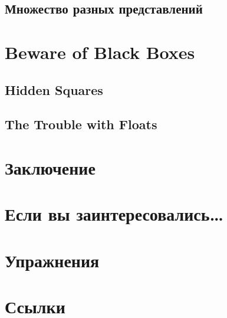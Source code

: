 \subsection{Множество разных представлений}

\newpage
\section{Beware of Black Boxes}
\subsection{Hidden Squares}
\subsection{The Trouble with Floats}
\section{Заключение}
\section{Если вы заинтересовались…}
\section{Упражнения}
\section{Ссылки}





